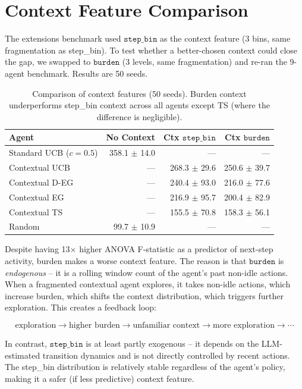 \documentclass[11pt]{article}
\begin{document}
\section{Context Feature Comparison}

The extensions benchmark used $\texttt{step\_bin}$ as the context feature (3 bins, same fragmentation as step\_bin). To test whether a better-chosen context could close the gap, we swapped to $\texttt{burden}$ (3 levels, same fragmentation) and re-ran the 9-agent benchmark. Results are 50 seeds.

\begin{table}[h]
\centering
\begin{tabular}{lrrr}
\toprule
Agent & No Context & Ctx $\texttt{step\_bin}$ & Ctx $\texttt{burden}$ \\
\midrule
Standard UCB ($c=0.5$) & 358.1 $\pm$ 14.0 & --- & --- \\
Contextual UCB & --- & 268.3 $\pm$ 29.6 & 250.6 $\pm$ 39.7 \\
Contextual D-EG & --- & 240.4 $\pm$ 93.0 & 216.0 $\pm$ 77.6 \\
Contextual EG & --- & 216.9 $\pm$ 95.7 & 200.4 $\pm$ 82.9 \\
Contextual TS & --- & 155.5 $\pm$ 70.8 & 158.3 $\pm$ 56.1 \\
\midrule
Random & 99.7 $\pm$ 10.9 & --- & --- \\
\bottomrule
\end{tabular}
\caption{Comparison of context features (50 seeds). Burden context underperforms step\_bin context across all agents except TS (where the difference is negligible).}
\end{table}

Despite having 13$\times$ higher ANOVA F-statistic as a predictor of next-step activity, burden makes a worse context feature. The reason is that $\texttt{burden}$ is \emph{endogenous} -- it is a rolling window count of the agent's past non-idle actions. When a fragmented contextual agent explores, it takes non-idle actions, which increase burden, which shifts the context distribution, which triggers further exploration. This creates a feedback loop:

\[
\text{exploration} \rightarrow \text{higher burden} \rightarrow \text{unfamiliar context} \rightarrow \text{more exploration} \rightarrow \cdots
\]

In contrast, $\texttt{step\_bin}$ is at least partly exogenous -- it depends on the LLM-estimated transition dynamics and is not directly controlled by recent actions. The step\_bin distribution is relatively stable regardless of the agent's policy, making it a safer (if less predictive) context feature.
\end{document}

